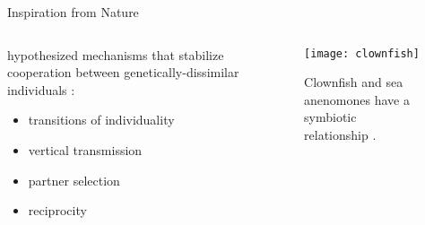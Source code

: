 \begin{frame}{Inspiration from Nature}

\begin{columns}
\begin{column}{0.5\textwidth}
hypothesized mechanisms that stabilize cooperation between genetically-dissimilar individuals \cite{vostinar2017suicide, andre2016evolutionary}:
\begin{itemize}
\item transitions of individuality
\item vertical transmission
\item partner selection
\item reciprocity
\end{itemize}
\end{column}
\begin{column}{0.5\textwidth}
\begin{figure}
\texttt{[image: clownfish]}
\caption{
Clownfish and sea anenomones have a symbiotic relationship \cite{dunn1981clownfish}.
}
\label{fig:clownfish}
\end{figure}
\end{column}
\end{columns}
\end{frame}
